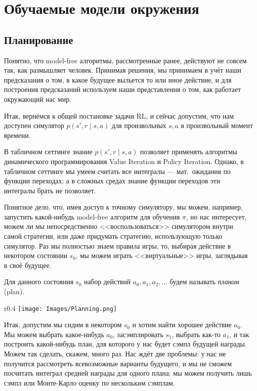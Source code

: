 \section{Обучаемые модели окружения}

\subsection{Планирование}

Понятно, что model-free алгоритмы, рассмотренные ранее, действуют не совсем так, как размышляет человек. Принимая решения, мы принимаем в учёт наши предсказания о том, в какое будущее выльется то или иное действие, и для построения предсказаний используем наши представления о том, как работает окружающий нас мир.

Итак, вернёмся к общей постановке задачи RL, и сейчас допустим, что нам доступен симулятор $p(s', r \mid s, a)$ для произвольных $s, a$ в произвольный момент времени.

В табличном сеттинге знание $p(s', r \mid s, a)$ позволяет применять алгоритмы динамического программирования Value Iteration и Policy Iteration. Однако, в табличном сеттинге мы умеем считать все интегралы --- мат.~ожидания по функции переходах; а в сложных средах знание функции переходов эти интегралы брать не позволяет.

Понятное дело, что, имея доступ к точному симулятору, мы можем, например, запустить какой-нибудь model-free алгоритм для обучения $\pi$, но нас интересует, можем ли мы непосредственно <<воспользоваться>> симулятором внутри самой стратегии, или даже придумать стратегию, использующую только симулятор. Раз мы полностью знаем правила игры, то, выбирая действие в некотором состоянии $s_0$, мы можем играть <<виртуальные>> игры, заглядывая в своё будущее. 

\begin{definition}
Для данного состояния $s_0$ набор действий $a_0, a_1, a_2, \dots$ будем называть \emph{планом} (plan).
\end{definition}

\begin{wrapfigure}{r}{0.4\textwidth}
\vspace{-0.5cm}
\centering
\texttt{[image: Images/Planning.png]}
\vspace{-0.5cm}
\end{wrapfigure}

Итак, допустим мы сидим в некотором $s_0$ и хотим найти хорошее действие $a_0$. Мы можем выбрать какое-нибудь $a_0$, засэмплировать $s_1$, выбрать как-то $a_1$, и так построить какой-нибудь план, для которого у нас будет сэмпл будущей награды. Можем так сделать, скажем, много раз. Нас ждёт две проблемы: у нас не получится рассмотреть всевозможные варианты будущего, и мы не сможем посчитать интеграл средней награды для одного плана; мы можем получить лишь сэмпл или Монте-Карло оценку по нескольким сэмплам.

